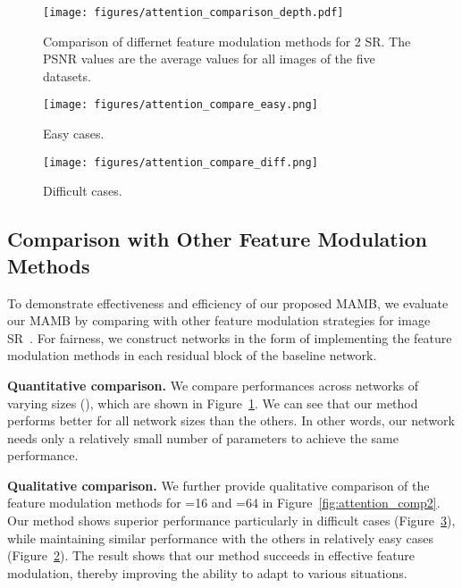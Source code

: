 \documentclass[final,5p,times,twocolumn]{elsarticle}
\begin{document}
\begin{figure}[t]
	\centering
	\texttt{[image: figures/attention\_comparison\_depth.pdf]}
	\caption{Comparison of differnet feature modulation methods for 2 SR. 
	The PSNR values are the average values for all images of the five datasets.}
	\label{fig:attention_comp}
\end{figure}

\begin{figure*}[t]
	\centering
	\begin{subfigure}[b]{0.9\textwidth}
		\texttt{[image: figures/attention\_compare\_easy.png]}
		\caption{Easy cases.}
		\label{fig:easy}
	\end{subfigure}
	\begin{subfigure}[b]{0.9\textwidth}
		\texttt{[image: figures/attention\_compare\_diff.png]}
		\caption{Difficult cases.}
		\label{fig:diff}
	\end{subfigure}
	\caption{Visual comparison of  SR results by our method and the other feature modulation methods on Set14~\cite{zeyde2010single} and Urban100~\cite{huang2015single}.}
	\label{fig:attention_comp2}
\end{figure*}

\subsection{Comparison with Other Feature Modulation Methods}
To demonstrate effectiveness and efficiency of our proposed MAMB, we evaluate our MAMB by comparing with other feature modulation strategies for image SR~\cite{zhang2018rcan,hu2018channel}.
For fairness, we construct networks in the form of implementing the feature modulation methods in each residual block of the baseline network.

\textbf{Quantitative comparison.}
We compare performances across networks of varying sizes (), which are shown in Figure~\ref{fig:attention_comp}.
We can see that our method performs better for all network sizes than the others.
In other words, our network needs only a relatively small number of parameters to achieve the same performance.

\textbf{Qualitative comparison.}
We further provide qualitative comparison of the feature modulation methods for =16 and =64 in Figure~\ref{fig:attention_comp2}.
Our method shows superior performance particularly in difficult cases (Figure~\ref{fig:diff}), while maintaining similar performance with the others in relatively easy cases (Figure~\ref{fig:easy}).
The result shows that our method succeeds in effective feature modulation, thereby improving the ability to adapt to various situations.
\end{document}
